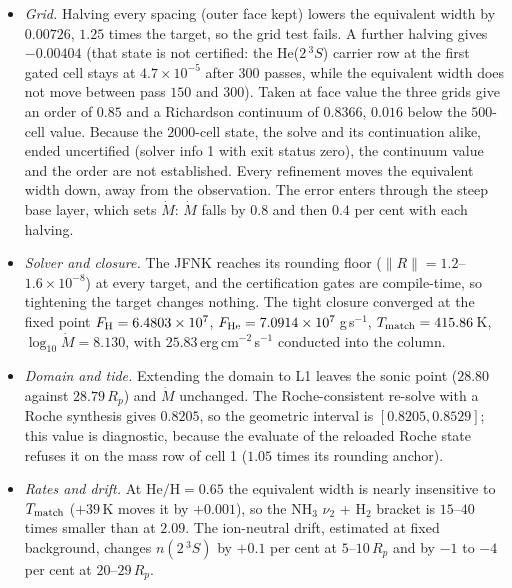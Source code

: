 \documentclass[english,a4paper]{my_memo}
\begin{document}
\begin{itemize}\itemsep0.2ex
\item \emph{Grid.} Halving every spacing (outer face kept) lowers the
      equivalent width by $0.00726$, $1.25$ times the target, so the grid
      test fails. A further halving gives $-0.00404$ (that state is not
      certified: the He($2\,^3S$) carrier row at the first gated cell stays
      at $4.7\times10^{-5}$ after $300$ passes, while the equivalent width
      does not move between pass $150$ and $300$). Taken at face value the
      three grids give an order of $0.85$ and a Richardson continuum of
      $0.8366$, $0.016$ below the $500$-cell value. Because the $2000$-cell
      state, the solve and its continuation alike, ended uncertified
      (solver info 1 with exit status zero), the continuum value and the
      order are not established. Every refinement moves the equivalent width down,
      away from the observation. The error enters through the steep base
      layer, which sets $\dot M$: $\dot M$ falls by $0.8$ and then $0.4$
      per cent with each halving.
\item \emph{Solver and closure.} The JFNK reaches its rounding floor
      ($\|R\| = 1.2$--$1.6\times10^{-8}$) at every target, and the
      certification gates are compile-time, so tightening the target
      changes nothing. The tight closure converged at the fixed point
      $F_{\rm H} = 6.4803\times10^{7}$, $F_{\rm He} = 7.0914\times10^{7}$\,g\,s$^{-1}$,
      $T_{\rm match} = 415.86$\,K, $\log_{10}\dot M = 8.130$, with
      $25.83$\,erg\,cm$^{-2}$\,s$^{-1}$ conducted into the column.
\item \emph{Domain and tide.} Extending the domain to L1 leaves the sonic
      point ($28.80$ against $28.79\,R_p$) and $\dot M$ unchanged. The
      Roche-consistent re-solve with a Roche synthesis gives $0.8205$, so
      the geometric interval is $[0.8205, 0.8529]$; this value is
      diagnostic, because the evaluate of the reloaded Roche state refuses
      it on the mass row of cell 1 ($1.05$ times its rounding anchor).
\item \emph{Rates and drift.} At $\mathrm{He/H} = 0.65$ the equivalent
      width is nearly insensitive to $T_{\rm match}$ ($+39$\,K moves it by
      $+0.001$), so the NH$_3$ $\nu_2$ + H$_2$ bracket is $15$--$40$ times
      smaller than at $2.09$. The ion-neutral drift, estimated at fixed
      background, changes $n(2\,^3S)$ by $+0.1$ per cent at $5$--$10\,R_p$
      and by $-1$ to $-4$ per cent at $20$--$29\,R_p$.
\end{itemize}
\end{document}
